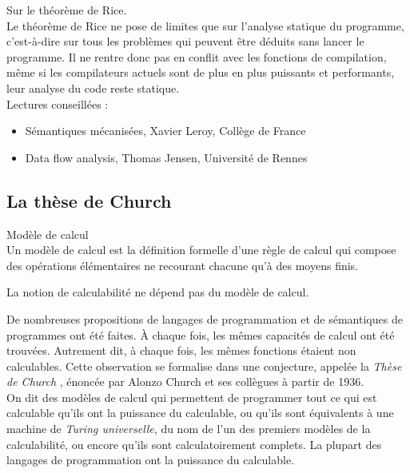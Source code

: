     \begin{Note} Sur le théorème de Rice.\\
        Le théorème de Rice ne pose de limites que sur l'analyse statique du programme, c'est-à-dire sur tous les problèmes qui peuvent être déduits sans lancer le programme. Il ne rentre donc pas en conflit avec les fonctions de compilation, même si les compilateurs actuels sont de plus en plus puissants et performants, leur analyse du code reste statique.\\
        Lectures conseillées :
        \begin{itemize}
            \item Sémantiques mécanisées, Xavier Leroy, Collège de France
            \item Data flow analysis, Thomas Jensen, Université de Rennes
        \end{itemize}
    \end{Note}

    \subsection{La thèse de Church}
    \begin{definition}
        Modèle de calcul\\
        Un modèle de calcul est la définition formelle d'une règle de calcul qui compose des opérations élémentaires ne recourant chacune qu'à des moyens finis.
    \end{definition}
    \begin{result}
        La notion de calculabilité ne dépend pas du modèle de calcul.
    \end{result}

    De nombreuses propositions de langages de programmation et de sémantiques de programmes ont été faites. À chaque fois, les mêmes capacités de calcul ont été trouvées. Autrement dit, à chaque fois, les mêmes fonctions étaient non calculables. Cette observation se formalise dans une conjecture, appelée la \emph{Thèse de Church} \autocite{church_unsolvable_1936}, énoncée par Alonzo Church et ses collègues à partir de 1936.\\
    On dit des modèles de calcul qui permettent de programmer tout ce qui est calculable qu'ils ont la puissance du calculable, ou qu'ils sont équivalents à une machine de \emph{Turing universelle}, du nom de l'un des premiers modèles de la calculabilité, ou encore qu'ils sont calculatoirement complets. La plupart des langages de programmation ont la puissance du calculable.


